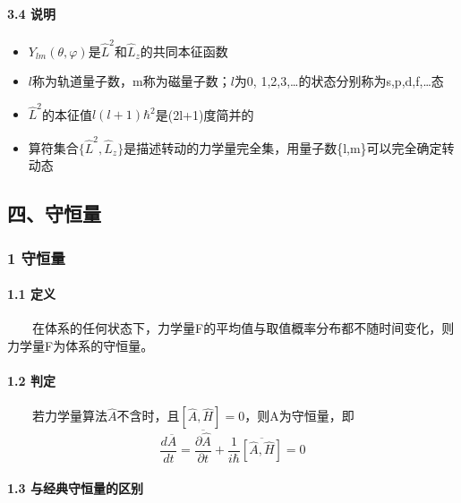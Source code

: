 \documentclass[UTF8,twocolumn]{ctexart}
\providecommand{\tightlist}{%
  \setlength{\itemsep}{0pt}\setlength{\parskip}{0pt}}
\let\oldparagraph\paragraph
\renewcommand{\paragraph}[1]{\oldparagraph{#1}\mbox{}}
\begin{document}
\hypertarget{ux8bf4ux660e}{%
\paragraph{ 3.4 说明}\label{ux8bf4ux660e}}

\begin{itemize}
\tightlist
\item
  \(Y_{lm}(\theta,\varphi)\)是\(\hat{L}^2\)和\(\hat{L}_z\)的共同本征函数
\item
  $l$称为轨道量子数，m称为磁量子数；$l$为0, 1,2,3,\ldots{}的状态分别称为s,p,d,f,\ldots{}态
\item
  \(\hat{L}^2\)的本征值\(l(l+1)\hbar^2\)是(2l+1)度简并的
\item
  算符集合\(\{\hat{L}^2,\hat{L}_z\}\)是描述转动的力学量完全集，用量子数\{l,m\}可以完全确定转动态
\end{itemize}

\hypertarget{ux56dbux5b88ux6052ux91cf}{%
\subsection{四、守恒量}\label{ux56dbux5b88ux6052ux91cf}}

\hypertarget{ux5b88ux6052ux91cf}{%
\subsubsection{1 守恒量}\label{ux5b88ux6052ux91cf}}

\hypertarget{ux5b9aux4e49-3}{%
\paragraph{ 1.1 定义}\label{ux5b9aux4e49-3}}

  在体系的任何状态下，力学量F的平均值与取值概率分布都不随时间变化，则力学量F为体系的守恒量。

\hypertarget{ux5224ux5b9a}{%
\paragraph{ 1.2 判定}\label{ux5224ux5b9a}}

  若力学量算法\(\hat{A}\)不含时，且\([\hat{A},\hat{H}]=0\)，则A为守恒量，即
\[\frac{d\overline{A}}{dt}=\frac{\overline{\partial\hat{A}}}{\partial t}+\frac{1}{i\hbar}\overline{[\hat{A},\hat{H}]}=0\]

\hypertarget{ux4e0eux7ecfux5178ux5b88ux6052ux91cfux7684ux533aux522b}{%
\paragraph{ 1.3
与经典守恒量的区别}\label{ux4e0eux7ecfux5178ux5b88ux6052ux91cfux7684ux533aux522b}}
\end{document}
